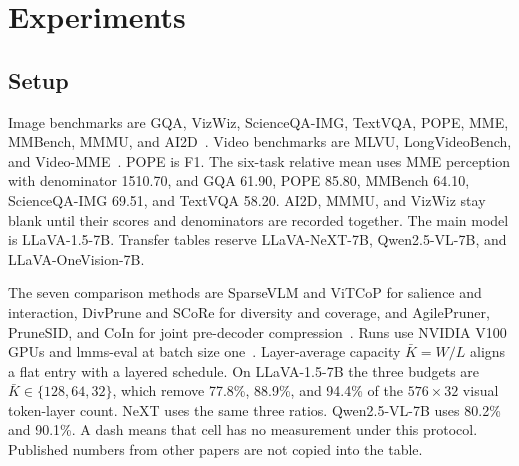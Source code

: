 \section{Experiments}
\label{sec:exp}

\subsection{Setup}
Image benchmarks are GQA, VizWiz, ScienceQA-IMG, TextVQA, POPE, MME, MMBench, MMMU, and AI2D~\cite{gqa,vizwiz,scienceqa,textvqa,pope,mme,mmbench,mmmu,ai2d}. Video benchmarks are MLVU, LongVideoBench, and Video-MME~\cite{mlvu,longvideobench,videomme}. POPE is F1. The six-task relative mean uses MME perception with denominator 1510.70, and GQA 61.90, POPE 85.80, MMBench 64.10, ScienceQA-IMG 69.51, and TextVQA 58.20. AI2D, MMMU, and VizWiz stay blank until their scores and denominators are recorded together. The main model is LLaVA-1.5-7B. Transfer tables reserve LLaVA-NeXT-7B, Qwen2.5-VL-7B, and LLaVA-OneVision-7B.

The seven comparison methods are SparseVLM and ViTCoP for salience and interaction, DivPrune and SCoRe for diversity and coverage, and AgilePruner, PruneSID, and CoIn for joint pre-decoder compression~\cite{agilepruner,prunesid}. Runs use NVIDIA V100 GPUs and lmms-eval at batch size one~\cite{lmmseval}. Layer-average capacity $\bar K=W/L$ aligns a flat entry with a layered schedule. On LLaVA-1.5-7B the three budgets are $\bar K\in\{128,64,32\}$, which remove 77.8\%, 88.9\%, and 94.4\% of the $576\times 32$ visual token-layer count. NeXT uses the same three ratios. Qwen2.5-VL-7B uses 80.2\% and 90.1\%. A dash means that cell has no measurement under this protocol. Published numbers from other papers are not copied into the table.

